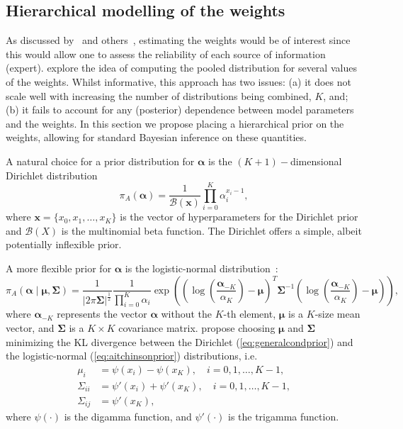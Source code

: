 \documentclass[a4paper, notitlepage, 10pt]{article}
\begin{document}
\subsection{Hierarchical modelling of the weights}
\label{sec:hierPrior}

As discussed by~\cite{Poole2000} and others~\citep{Zhong2015,Li2017}, estimating the weights would be of interest since this would allow one to assess the reliability of each source of information (expert).
\cite{Li2017} explore the idea of computing the pooled distribution for several values of the weights.
Whilst informative, this approach has two issues: (a) it does not scale well with increasing the number of distributions being combined, $K$, and; (b) it fails to account for any (posterior) dependence between model parameters and the weights.
In this section we propose placing a hierarchical prior on the weights, allowing for standard Bayesian inference on these quantities.

A natural choice for a prior distribution for $\boldsymbol\alpha$ is the $(K+1)-$dimensional Dirichlet distribution
\begin{equation}
 \label{eq:generalcondprior}
 \pi_A(\boldsymbol\alpha) = \frac{1}{\mathcal{B}(\boldsymbol x)}\prod_{i=0}^K \alpha_i^{x_i-1},
\end{equation}
where $\boldsymbol x = \{ x_0, x_1, \ldots, x_K\}$ is the vector of hyperparameters for the Dirichlet prior and $\mathcal{B}(X)$ is the multinomial beta function.
The Dirichlet offers a simple, albeit potentially inflexible prior.

A more flexible prior for $\boldsymbol\alpha$ is the logistic-normal distribution~\citep{Aitchson1980}:
\begin{equation}
 \label{eq:aitchinsonprior}
 \pi_A(\boldsymbol\alpha \mid \boldsymbol \mu, \boldsymbol \Sigma) = \frac{1}{|2\pi \boldsymbol \Sigma|^{\frac{1}{2}}}\frac{1}{\prod_{i=0}^K \alpha_i}
  \exp\left(
     \left(\log\left(\frac{\boldsymbol \alpha_{-K}}{\alpha_K}\right) - \boldsymbol \mu\right)^T
     {\boldsymbol \Sigma}^{-1}
     \left(\log\left(\frac{\boldsymbol \alpha_{-K}}{\alpha_K}\right) - \boldsymbol \mu\right)
     \right),
\end{equation}
where $\boldsymbol \alpha_{-K}$ represents the vector $\boldsymbol \alpha$ without the $K$-th element, $\boldsymbol \mu$ is a $K$-size mean vector, and $\boldsymbol \Sigma$ is a $K \times K$ covariance matrix.
\citep{Aitchson1980} propose choosing $\boldsymbol \mu$ and $\boldsymbol \Sigma$ minimizing the KL divergence between the Dirichlet (\ref{eq:generalcondprior}) and the logistic-normal (\ref{eq:aitchinsonprior}) distributions, i.e.
\begin{align}
 \label{eq:momentmatching}
 \mu_i & = \psi(x_i) - \psi(x_K), \quad i=0,1,\ldots,K-1, \\
 \Sigma_{ii} & = \psi'(x_i) + \psi'(x_K), \quad i=0,1,\ldots,K-1, \\
 \Sigma_{ij} & = \psi'(x_K),
\end{align}
where $\psi(\cdot)$ is the digamma function, and $\psi'(\cdot)$ is the trigamma function.
\end{document}
